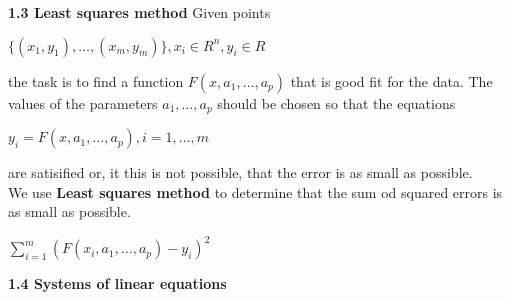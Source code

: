 \documentclass{article}
\begin{document}
\begin{multicols}{3}
\textbf{1.3 Least squares method}
Given points
\begin{center}
    \begin{math}
        \{ (x_1, y_1), \dots, (x_m, y_m) \}, x_i \in R^n , y_i \in R
    \end{math}
\end{center}
the task is to find a function $F(x, a_1, \dots, a_p)$ that is good fit for the data.
The values of the parameters $a_1, \dots, a_p$ should be chosen so that the equations
\begin{center}
    \begin{math}
        y_i = F(x, a_1, \dots, a_p), i=1,\dots,m
    \end{math}
\end{center} are satisified or, it this is not possible, that the error is as small as possible.\\
We use \textbf{Least squares method} to determine that the sum od squared errors is as small as possible.
\begin{center}
    \begin{math}
        \sum_{i=1}^m (F(x_i, a_1, \dots, a_p) - y_i)^2
    \end{math}
\end{center}

\textbf{1.4 Systems of linear equations}


\end{multicols}
\end{document}
